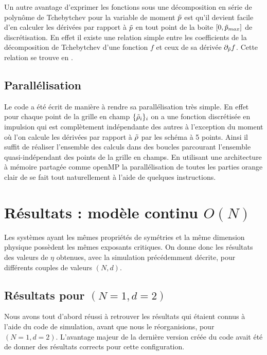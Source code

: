 \documentclass[10.5pt]{article}
\begin{document}
\begin{multicols*}{2}
Un autre avantage d'exprimer les fonctions sous une décomposition en série de polynôme de Tchebytchev pour la variable de moment $\tilde{p}$ est qu'il devient facile d'en calculer les dérivées par rapport à $\tilde{p}$ en tout point de la boite $[0, \tilde{p}_{max}]$ de discrétisation. En effet il existe une relation simple entre les coefficients de la décomposition de Tchebytchev d'une fonction $f$ et ceux de sa dérivée $\partial_{\tilde{p}} f$. Cette relation se trouve en . 


\subsection{Parallélisation}


Le code a été écrit de manière à rendre sa parallélisation très simple. En effet pour chaque point de la grille en champ $\{\tilde{\rho}_i\}_i$ on a une fonction discrétisée en impulsion qui est complètement indépendante des autres à l'exception du moment où l'on calcule les dérivées par rapport à $\tilde{\rho}$ par les schéma à 5 points. Ainsi il suffit de réaliser l'ensemble des calculs dans des boucles parcourant l'ensemble quasi-indépendant des points de la grille en champs. En utilisant une architecture à mémoire partagée comme openMP \cite{openmp2002c++} la parallélisation de toutes les parties orange clair de  se fait tout naturellement à l'aide de quelques instructions. 



\section{Résultats : modèle continu $O(N)$}

\label{sec:ResContinu}

Les systèmes ayant les mêmes propriétés de symétries et la même dimension physique possèdent les mêmes exposants critiques. On donne donc les résultats des valeurs de $\eta$ obtenues, avec la simulation précédemment décrite, pour différents couples de valeurs $(N,d)$.


\subsection{Résultats pour $(N = 1, d=2)$}

Nous avons tout d'abord réussi à retrouver les résultats qui étaient connus à l'aide du code de simulation, avant que nous le réorganisions, pour $(N=1, d=2)$. L'avantage majeur de la dernière version créée du code avait été de donner des résultats corrects pour cette configuration.


\end{multicols*}
\end{document}
